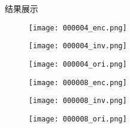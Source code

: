\documentclass[9pt]{beamer}
\begin{document}


\begin{frame}{结果展示}

\begin{figure}[htbp]
	\centering
		\begin{minipage}[t]{0.25\linewidth}
			\centering
			\texttt{[image: 000004\_enc.png]}
		\end{minipage}

		\begin{minipage}[t]{0.25\linewidth}
			\centering
			\texttt{[image: 000004\_inv.png]}
		\end{minipage}

		\begin{minipage}[t]{0.25\linewidth}
			\centering
			\texttt{[image: 000004\_ori.png]}
		\end{minipage}
\end{figure}

\begin{figure}[htbp]
	\centering
	\begin{minipage}[t]{0.25\linewidth}
		\centering
		\texttt{[image: 000008\_enc.png]}
	\end{minipage}
	
	\begin{minipage}[t]{0.25\linewidth}
		\centering
		\texttt{[image: 000008\_inv.png]}
	\end{minipage}
	
	\begin{minipage}[t]{0.25\linewidth}
		\centering
		\texttt{[image: 000008\_ori.png]}
	\end{minipage}
\end{figure}

	
\end{frame}
\end{document}
